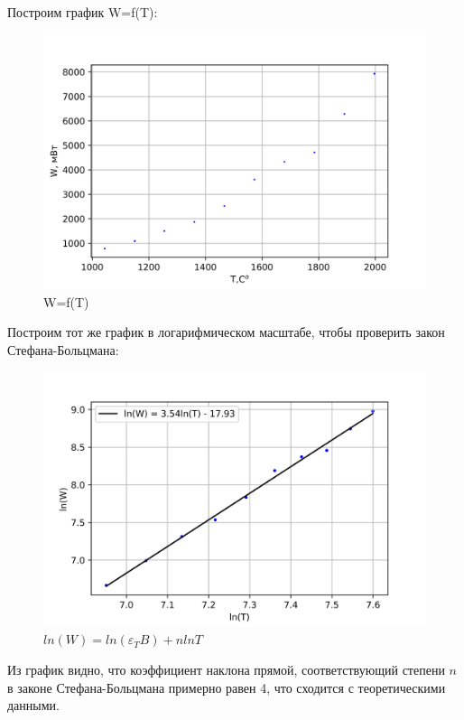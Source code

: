 \documentclass[a4paper,12pt]{report}
\begin{document}
Построим график W=f(T):

\begin{figure}[H]
    \centering
    \includegraphics[width=14cm]{W(T).png}
    \caption{W=f(T)}
    \label{fig:vac}
\end{figure}

Построим тот же график в логарифмическом масштабе, чтобы проверить закон Стефана-Больцмана:

\begin{figure}[H]
    \centering
    \includegraphics[width=14cm]{lnW(lnT).png}
    \caption{$ln(W) = ln(\varepsilon_{T}B)+nlnT$}
    \label{fig:vac}
\end{figure}

Из график видно, что коэффициент наклона прямой, соответствующий степени $n$ в законе Стефана-Больцмана примерно равен 4, что сходится с теоретическими данными.
\end{document}
